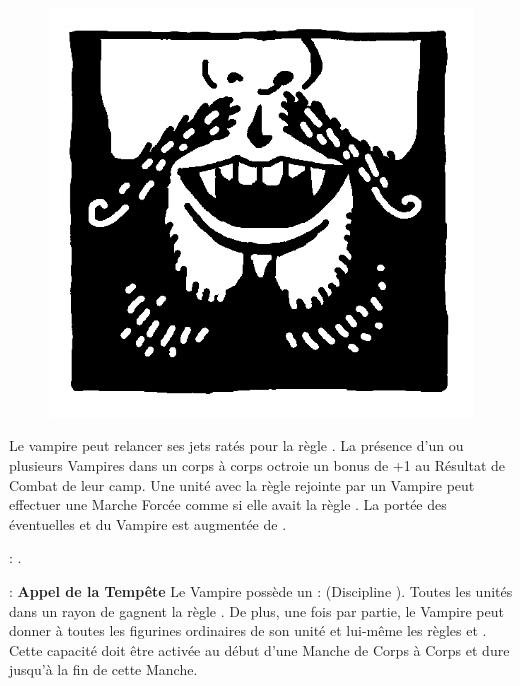 
\begin{figure}
\centering
\includegraphics[width=\logosize]{pics/logo_vonkarnstein.png}
\end{figure}
Le vampire peut relancer ses jets ratés pour la règle \vampiric{}. La présence d'un ou plusieurs Vampires \vonkarnstein{} dans un corps à corps octroie un bonus de +1 au Résultat de Combat de leur camp. Une unité avec la règle \undead{} rejointe par un Vampire \vonkarnstein{} peut effectuer une Marche Forcée comme si elle avait la règle \vampiric{}. La portée des éventuelles \inspiringpresence{} et \holdyourground{} du Vampire est augmentée de . 

\vspace{0.5cm}
\bloodties{} : \textbf{\darkcoach{}}.

\vspace{0.5cm}
\ancientbloodpower{} : \textbf{Appel de la Tempête}\dotfill{}\newline%
Le Vampire possède un  : \heavensspelltwo{} (Discipline \heavens{}). Toutes les unités dans un rayon de  gagnent la règle \hardtarget{}. De plus, une fois par partie, le Vampire peut donner à toutes les figurines ordinaires de son unité et lui-même les règles \lightningattacks{} et \lightningreflexes{}. Cette capacité doit être activée au début d'une Manche de Corps à Corps et dure jusqu'à la fin de cette Manche.


